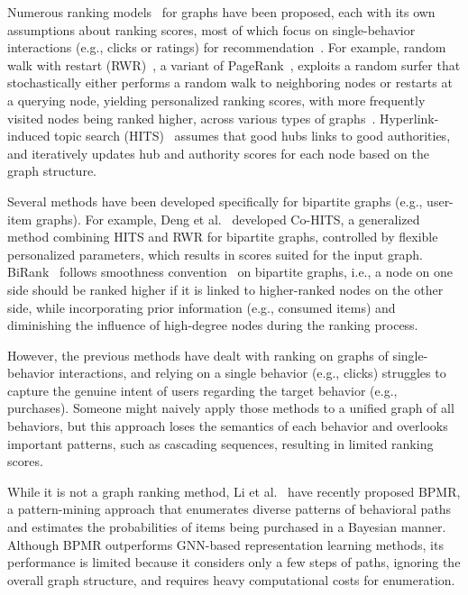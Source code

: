 Numerous ranking models~\cite{PanPYFD04,KleinbergK99,DengDLK09kqpg,HeHGKW17,MaMGZ08,BrinB98,HaveliwalaH02} for graphs have been proposed, each with its own assumptions about ranking scores, most of which focus on single-behavior interactions (e.g., clicks or ratings) for recommendation~\cite{GoriGP07,ParkPJK17,HeHGKW17,NikolakopoulosNK19,TianJ13}.
%
For example, random walk with restart (RWR)~\cite{PanPYFD04, MaMGZ08,ShinJSK15,JungPSK17,LeeLJ22}, a variant of PageRank~\cite{BrinB98}, exploits a random surfer that stochastically either performs a random walk to neighboring nodes or restarts at a querying node, yielding personalized ranking scores, with more frequently visited nodes being ranked higher, across various types of graphs~\cite{JungJJSK16,JungJPK21,ChunLSJ24}.
Hyperlink-induced topic search (HITS)~\cite{KleinbergK99} assumes that good hubs links to good authorities, and iteratively updates hub and authority scores for each node based on the graph structure. 

Several methods have been developed specifically for bipartite graphs (e.g., user-item graphs).
For example, Deng et al.~\cite{DengDLK09kqpg} developed Co-HITS, a generalized method combining HITS and RWR for bipartite graphs, controlled by flexible personalized parameters, which results in scores suited for the input graph.
BiRank~\cite{HeHGKW17} follows smoothness convention~\cite{ZhouZBLWS03,AgarwalA06} on bipartite graphs, i.e., a node on one side should be ranked higher if it is linked to higher-ranked nodes on the other side, while incorporating prior information (e.g., consumed items) and diminishing the influence of high-degree nodes during the ranking process.

However, the previous methods have dealt with ranking on graphs of single-behavior interactions, and relying on a single behavior (e.g., clicks) struggles to capture the genuine intent of users regarding the target behavior (e.g., purchases).
Someone might naively apply those methods to a unified graph of all behaviors, but this approach loses the semantics of each behavior and overlooks important patterns, such as cascading sequences, resulting in limited ranking scores.

While it is not a graph ranking method, Li et al.~\cite{LiLCYLLD24} have recently proposed BPMR, a pattern-mining approach that enumerates diverse patterns of behavioral paths and estimates the probabilities of items being purchased in a Bayesian manner.
Although BPMR outperforms GNN-based representation learning methods, its performance is limited because it considers only a few steps of paths, ignoring the overall graph structure, and requires heavy computational costs for enumeration.
